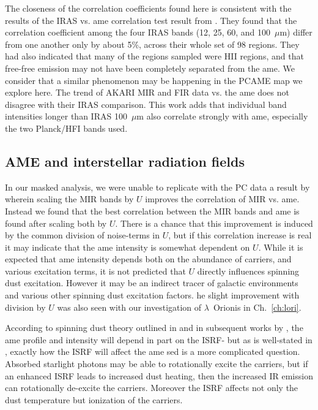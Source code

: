        The closeness of the correlation coefficients found here is consistent with the results of the IRAS vs. \acrshort{ame} correlation test result from \cite{planckXV}. They found that the correlation coefficient among the four IRAS bands (12, 25, 60, and 100~$\mu$m) differ from one another only by about 5\%, across their whole set of 98 regions. They had also indicated that many of the regions sampled were HII regions, and that free-free emission may not have been completely separated from the \acrshort{ame}. We consider that a similar phenomenon may be happening in the PCAME map we explore here. The trend of AKARI MIR and FIR data vs. the \acrshort{ame} does not disagree with their IRAS comparison. This work adds that individual band intensities longer than IRAS 100~$\mu$m also correlate strongly with \acrshort{ame}, especially the two Planck/HFI bands used.

          \subsection{AME and interstellar radiation fields}
            In our masked analysis, we were unable to replicate with the PC data a result by \cite{ysard10b} wherein scaling the MIR bands by $U$ improves the correlation of MIR vs. \acrshort{ame}. Instead we found that the best correlation between the MIR bands and \acrshort{ame} is found after scaling both by $U$. There is a chance that this improvement is induced by the common division of noise-terms in $U$, but if this correlation increase is real it may indicate that the \acrshort{ame} intensity is somewhat dependent on $U$. While it is expected that \acrshort{ame} intensity depends both on the abundance of carriers, and various excitation terms, it is not predicted that $U$ directly influences spinning dust excitation. However it may be an indirect tracer of galactic environments and various other spinning dust excitation factors. he slight improvement with division by $U$ was also seen with our investigation of $\lambda$~Orionis in Ch.~\ref{ch:lori}.

            According to spinning dust theory outlined in \cite{draine98a} and in subsequent works by \cite{ysard10a}, the \acrshort{ame} profile and intensity will depend in part on the ISRF- but as is well-stated in \cite{hensley17a}, exactly how the ISRF will affect the \acrshort{ame} \acrshort{sed} is a more complicated question. Absorbed starlight photons may be able to rotationally excite the carriers, but if an enhanced ISRF leads to increased dust heating, then the increased IR emission can rotationally de-excite the carriers. Moreover the ISRF affects not only the dust temperature but ionization of the carriers.

